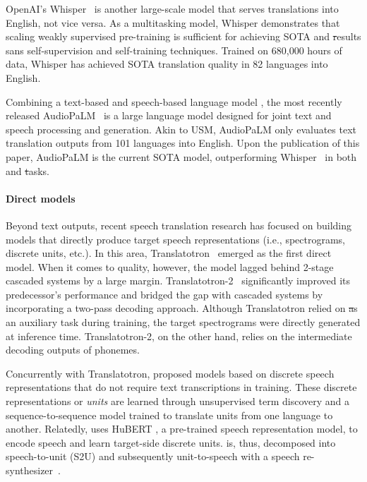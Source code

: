 OpenAI's Whisper~\citep{whisper} is another large-scale model that serves translations into English, not vice versa. As a multitasking model, Whisper demonstrates that scaling weakly supervised pre-training is sufficient for achieving SOTA \asr and \st results sans self-supervision and self-training techniques. Trained on 680,000 hours of data, Whisper has achieved SOTA translation quality in 82 \fleurs languages into English.

Combining a text-based \citep{anil2023palm} and speech-based language model \citep{10158503}, the most recently released AudioPaLM~\citep{Rubenstein2023AudioPaLMAL} is a large language model designed for joint text and speech processing and generation. Akin to USM, AudioPaLM only evaluates text translation outputs from 101 \fleurs languages into English. Upon the publication of this paper, AudioPaLM is the current SOTA model, outperforming Whisper~\citep{whisper} in both \asr and \st tasks. 



\paragraph{Direct \sst models}
Beyond text outputs, recent speech translation research has focused on building models that directly produce target speech representations (i.e., spectrograms, discrete units, etc.). In this area, Translatotron~\citep{jia:interspeech:2019} emerged as the first direct \sst model. When it comes to quality, however, the model lagged behind 2-stage cascaded systems by a large margin.
Translatotron-2~\citep{pmlr-v162-jia22b} significantly improved its predecessor's performance and bridged the gap with cascaded systems by incorporating a two-pass decoding approach. Although Translatotron relied on \st as an auxiliary task during training, the target spectrograms were directly generated at inference time. Translatotron-2, on the other hand, relies on the intermediate decoding outputs of phonemes.

Concurrently with Translatotron, \cite{tjandra2019speech} proposed \sst models based on discrete speech representations that do not require text transcriptions in training.
These discrete representations or \textit{units} are learned through unsupervised term discovery and a sequence-to-sequence model trained to translate units from one language to another.
Relatedly, \cite{lee-etal-2022-direct} uses HuBERT \citep{hsu2021hubert}, a pre-trained speech representation model, to encode speech and learn target-side discrete units. \sst is, thus, decomposed into speech-to-unit (S2U) and subsequently unit-to-speech with a speech re-synthesizer~\citep{polyak21_interspeech}.

